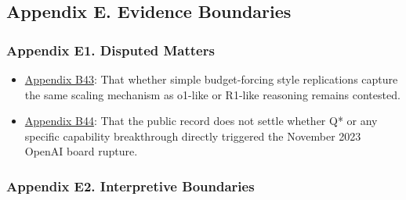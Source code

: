 \documentclass[
  american,
  11pt,
  letterpaper,
]{article}
\providecommand{\tightlist}{%
  \setlength{\itemsep}{0pt}\setlength{\parskip}{0pt}}
\begin{document}
\subsection{Appendix E. Evidence
Boundaries}\label{appendix-e.-evidence-boundaries-6}

\subsubsection{Appendix E1. Disputed
Matters}\label{ch-06-appendix-e1-disputed-matters}

\begin{itemize}
\tightlist
\item
  \hyperref[ch-06-appendix-b43-whether-simple-budget-forcing-style-replications-capture-the-same-scaling-mechani]{Appendix
  B43}: That whether simple budget-forcing style replications capture
  the same scaling mechanism as o1-like or R1-like reasoning remains
  contested.
\item
  \hyperref[ch-06-appendix-b44-the-public-record-does-not-settle-whether-q-or-any-specific-capability-breakthro]{Appendix
  B44}: That the public record does not settle whether Q* or any
  specific capability breakthrough directly triggered the November 2023
  OpenAI board rupture.
\end{itemize}

\subsubsection{Appendix E2. Interpretive
Boundaries}\label{ch-06-appendix-e2-interpretive-boundaries}
\end{document}

